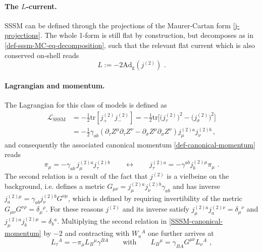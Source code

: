 \documentclass[12pt]{article}
\numberwithin{equation}{section}
\begin{document}
\paragraph{The $L$-current.} SSSM can be defined through the projections of the Maurer-Cartan form \eqref{j-projections}. The whole 1-form is still flat by construction, but decomposes as in \eqref{def-sssm-MC-eq-decomposition}, such that the relevant flat current which is also conserved on-shell reads  
\begin{equation}
L:=-2\mathrm{Ad}_{\mathrm{g}}(j^{(2)}) \,\, .
\end{equation}

\paragraph{Lagrangian and momentum.}
The Lagrangian for this class of models is defined as 
\begin{equation}
\begin{aligned}
\mathcal{L}_{\textrm{SSSM}}&=-\tfrac{1}{2} \mathrm{tr}[j^{(2)}_{+}j^{(2)}_{-}]= -\tfrac{1}{2}\mathrm{tr}\bigl[\bigl(j^{(2)}_{\tau}\bigr)^{2}-\bigl(j^{(2)}_{\sigma}\bigr)^{2}\bigr] 
\\
&=-\tfrac{1}{2}\gamma_{ab}(\partial_{\tau}Z^{\mu}\partial_{\tau}Z^{\nu}-\partial_{\sigma}Z^{\mu}\partial_{\sigma}Z^{\nu})j^{(2)a}_{\mu}j_{\nu}^{(2)b} \, ,
\end{aligned}
\end{equation}
and consequently the associated canonical momentum \eqref{def-canonical-momentum} reads
\begin{equation}\label{SSSM-canonical-momentum}
\pi_{\mu}= -\gamma_{ab} \, j_{\mu}^{(2)a}j_{\tau}^{(2)b}
\qquad \longleftrightarrow \qquad 
j_{\tau}^{(2)a}=-\gamma^{ab}j_{b}^{(2)\mu}\pi_{\mu} \,\, .
\end{equation}
The second relation is a result of the fact that $j^{(2)}$ is a vielbeine on the background, i.e. defines a metric $G_{\mu\nu}=j_{\mu}^{(2)a}j_{\nu}^{(2)b}\gamma_{ab}$ and has inverse $j_{a}^{(2)\mu}=\gamma_{ab}j_{\nu}^{(2)b}G^{\nu\mu}$, which is defined by requiring invertibility of the metric $G_{\mu\nu}G^{\nu\rho}=\delta_{\mu}{}^{\rho}$. For these reasons $j^{(2)}$ and its inverse satisfy $j_{\mu}^{(2)a}j_{a}^{(2)\nu}=\delta_{\mu}{}^{\nu}$ and $j_{\mu}^{(2)a}j_{b}^{(2)\mu}=\delta_{b}{}^{a}$. Multiplying the second relation in \eqref{SSSM-canonical-momentum} by $-2$ and contracting with $W_{a}{}^{A}$ one further arrives at 
\begin{equation}\label{SSSM-Jtau-momentum}
L_{\tau}{}^{A}=-\pi_{\mu}L_{B}{}^{\mu}\gamma^{BA} 
\qquad \text{with} \qquad 
L_{B}{}^{\mu}=\gamma_{BA}G^{\mu\nu}L_{\nu}{}^{A} \,\, ,
\end{equation}
\end{document}
